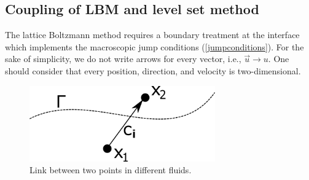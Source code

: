 \documentclass[final,leqno,onefignum,onetabnum]{siamltexmm}
\begin{document}
\subsection{Coupling of LBM and level set method}
The lattice Boltzmann method requires a boundary treatment at the interface which implements the macroscopic jump conditions (\ref{jumpconditions}). For the sake of simplicity, we do not write arrows for every vector, i.e., $\vec{u} \rightarrow u$. One should consider that every position, direction, and velocity is two-dimensional. 
\begin{figure}[h!]
	\hfill\includegraphics[width=8cm,natwidth=437,natheight=178]{coupling.png}\hspace*{\fill}
	\caption{Link between two points in different fluids.}
	\label{coupling}
\end{figure}
\end{document}
